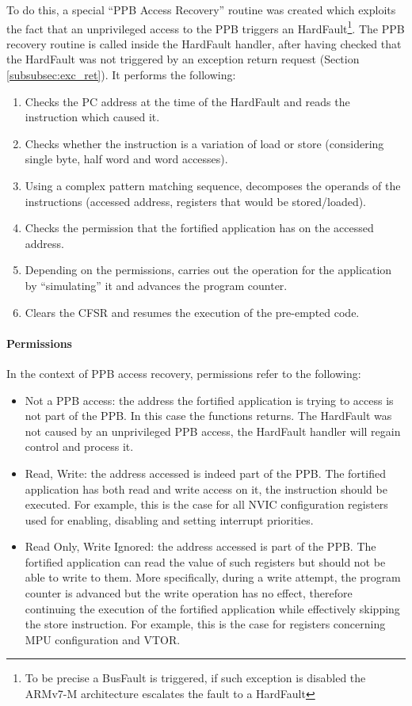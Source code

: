 \documentclass{article}
\begin{document}
To do this, a special ``PPB Access Recovery'' routine was created which exploits the fact that an unprivileged access to the PPB triggers an HardFault\footnote{To be precise a BusFault is triggered, if such exception is disabled the ARMv7-M architecture escalates the fault to a HardFault}. The PPB recovery routine is called inside the HardFault handler, after having checked that the HardFault was not triggered by an exception return request (Section \ref{subsubsec:exc_ret}). It performs the following:
\begin{enumerate}
	\item Checks the PC address at the time of the HardFault and reads the instruction which caused it.
	\item Checks whether the instruction is a variation of load or store (considering single byte, half word and word accesses).
	\item Using a complex pattern matching sequence, decomposes the operands of the instructions (accessed address, registers that would be stored/loaded).
	\item Checks the permission that the fortified application has on the accessed address.
	\item Depending on the permissions, carries out the operation for the application by ``simulating'' it and advances the program counter.
	\item Clears the CFSR and resumes the execution of the pre-empted code.
\end{enumerate}

\paragraph{Permissions}
In the context of PPB access recovery, permissions refer to the following:
\begin{itemize}
	\item Not a PPB access: the address the fortified application is trying to access is not part of the PPB. In this case the functions returns. The HardFault was not caused by an unprivileged PPB access, the HardFault handler will regain control and process it.
	\item Read, Write: the address accessed is indeed part of the PPB. The fortified application has both read and write access on it, the instruction should be executed. For example, this is the case for all NVIC configuration registers used for enabling, disabling and setting interrupt priorities.
	\item Read Only, Write Ignored: the address accessed is part of the PPB. The fortified application can read the value of such registers but should not be able to write to them. More specifically, during a write attempt, the program counter is advanced but the write operation has no effect, therefore continuing the execution of the fortified application while effectively skipping the store instruction. For example, this is the case for registers concerning MPU configuration and VTOR.
\end{itemize}
\end{document}
